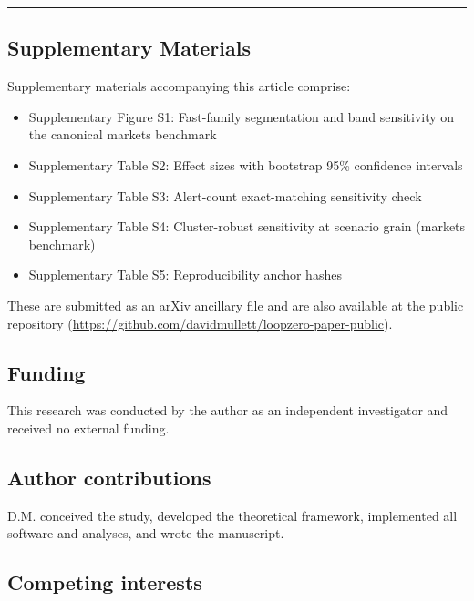 \documentclass[
  11pt,
]{article}
\providecommand{\tightlist}{%
  \setlength{\itemsep}{0pt}\setlength{\parskip}{0pt}}
\begin{document}
\begin{center}\rule{0.5\linewidth}{0.5pt}\end{center}

\subsection{Supplementary Materials}\label{supplementary-materials}

Supplementary materials accompanying this article comprise:

\begin{itemize}
\tightlist
\item
  Supplementary Figure S1: Fast-family segmentation and band sensitivity
  on the canonical markets benchmark
\item
  Supplementary Table S2: Effect sizes with bootstrap 95\% confidence
  intervals
\item
  Supplementary Table S3: Alert-count exact-matching sensitivity check
\item
  Supplementary Table S4: Cluster-robust sensitivity at scenario grain
  (markets benchmark)
\item
  Supplementary Table S5: Reproducibility anchor hashes
\end{itemize}

These are submitted as an arXiv ancillary file and are also available at
the public repository
(\url{https://github.com/davidmullett/loopzero-paper-public}).

\subsection{Funding}\label{funding}

This research was conducted by the author as an independent investigator
and received no external funding.

\subsection{Author contributions}\label{author-contributions}

D.M. conceived the study, developed the theoretical framework,
implemented all software and analyses, and wrote the manuscript.

\subsection{Competing interests}\label{competing-interests}
\end{document}
